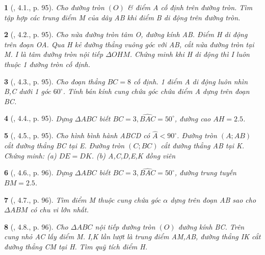 \documentclass{article}
\newtheorem{baitoan}{}
\begin{document}
\begin{baitoan}[\cite{Binh_boi_duong_Toan_9_tap_2}, 4.1., p. 95]
	Cho đường tròn $(O)$ \& điểm A cố định trên đường tròn. Tìm tập hợp các trung điểm M của dây AB khi điểm B di động trên đường tròn.
\end{baitoan}

\begin{baitoan}[\cite{Binh_boi_duong_Toan_9_tap_2}, 4.2., p. 95]
	Cho nửa đường tròn tâm O, đường kính AB. Điểm H di động trên đoạn OA. Qua H kẻ đường thẳng vuông góc với AB, cắt nửa đường tròn tại M. I là tâm đường tròn nội tiếp $\Delta OHM$. Chứng minh khi H di động thì I luôn thuộc 1 đường tròn cố định.
\end{baitoan}

\begin{baitoan}[\cite{Binh_boi_duong_Toan_9_tap_2}, 4.3., p. 95]
	Cho đoạn thẳng $BC = 8$ cố định. 1 điểm A di động luôn nhìn B,C dưới 1 góc $60^\circ$. Tính bán kính cung chứa góc chứa điểm A dựng trên đoạn BC.
\end{baitoan}

\begin{baitoan}[\cite{Binh_boi_duong_Toan_9_tap_2}, 4.4., p. 95]
	Dựng $\Delta ABC$ biết $BC = 3,\widehat{BAC} = 50^\circ$, đường cao $AH = 2.5$.
\end{baitoan}

\begin{baitoan}[\cite{Binh_boi_duong_Toan_9_tap_2}, 4.5., p. 95]
	Cho hình bình hành ABCD có $\widehat{A} < 90^\circ$. Đường tròn $(A;AB)$ cắt đường thẳng BC tại E. Đường tròn $(C;BC)$ cắt đường thẳng AB tại K. Chứng minh: (a) $DE = DK$. (b) A,C,D,E,K đồng viên
\end{baitoan}

\begin{baitoan}[\cite{Binh_boi_duong_Toan_9_tap_2}, 4.6., p. 96]
	Dựng $\Delta ABC$ biết $BC = 3,\widehat{BAC} = 50^\circ$, đường trung tuyến $BM = 2.5$.
\end{baitoan}

\begin{baitoan}[\cite{Binh_boi_duong_Toan_9_tap_2}, 4.7., p. 96]
	Tìm điểm M thuộc cung chứa góc $\alpha$ dựng trên đoạn AB sao cho $\Delta ABM$ có chu vi lớn nhất.
\end{baitoan}

\begin{baitoan}[\cite{Binh_boi_duong_Toan_9_tap_2}, 4.8., p. 96]
	Cho $\Delta ABC$ nội tiếp đường tròn $(O)$ đường kính BC. Trên cung nhỏ AC lấy điểm M. I,K lần lượt là trung điểm AM,AB, đường thẳng IK cắt đường thẳng CM tại H. Tìm quỹ tích điểm H.
\end{baitoan}
\end{document}
